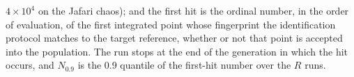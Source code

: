 $4\times10^4$ on the Jafari chaos); and the first hit is the ordinal number, in the order of evaluation, of the first integrated point whose fingerprint the identification protocol matches to the target reference, whether or not that point is accepted into the population. The run stops at the end of the generation in which the hit occurs, and $N_{0.9}$ is the 0.9 quantile of the first-hit number over the $R$ runs.
